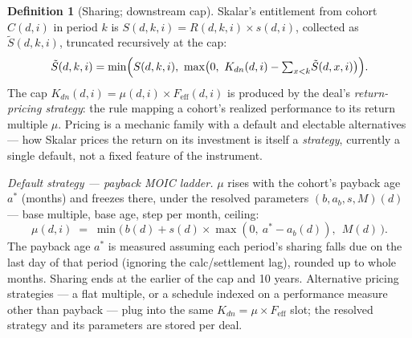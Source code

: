 \documentclass[11pt, a4paper]{article}
\theoremstyle{definition}
\newtheorem{definition}{Definition}[section]
\newcommand{\src}[1]{}
\newcommand{\KCIA}{downstream agreement}
\newcommand{\FudoTS}{downstream term sheet}
\newcommand{\Stil}{\tilde{S}}                     %
\newcommand{\capdn}{K_{dn}}                       %
\begin{document}
\begin{definition}[Sharing; downstream cap]\label{def:capdn}
Skalar's entitlement from cohort $C(d,i)$ in period $k$ is $S(d,k,i) = R(d,k,i) \times s(d,i)$, collected as $\Stil(d,k,i)$, truncated recursively at the cap:
\[
\Stil(d,k,i) = \min\Bigl( S(d,k,i),\ \max\bigl(0,\ \capdn(d,i) - {\textstyle\sum_{x<k}}\Stil(d,x,i)\bigr) \Bigr).
\]
The cap $\capdn(d,i) = \mu(d,i) \times F_{\mathrm{eff}}(d,i)$ is produced by the deal's \emph{return-pricing strategy}: the rule mapping a cohort's realized performance to its return multiple $\mu$. Pricing is a mechanic family with a default and electable alternatives --- how Skalar prices the return on its investment is itself a \emph{strategy}, currently a single default, not a fixed feature of the instrument.

\emph{Default strategy --- payback MOIC ladder.} $\mu$ rises with the cohort's payback age $a^*$ (months) and freezes there, under the resolved parameters $(b, a_b, s, M)(d)$ --- base multiple, base age, step per month, ceiling:
\[
\mu(d, i) \;=\; \min\bigl(\, b(d) + s(d) \times \max(0,\ a^* - a_b(d)),\ \ M(d) \,\bigr).
\]
The payback age $a^*$ is measured assuming each period's sharing falls due on the last day of that period (ignoring the calc/settlement lag), rounded up to whole months. Sharing ends at the earlier of the cap and 10 years. Alternative pricing strategies --- a flat multiple, or a schedule indexed on a performance measure other than payback --- plug into the same $\capdn = \mu \times F_{\mathrm{eff}}$ slot; the resolved strategy and its parameters are stored per deal.
\src{Template: \KCIA{} Sch.~A (``Return Multiple'', ``Return Multiple Cap'', ``Payback Period'', ``Investor Cap Amount'', ``Outstanding Investor Share''); \FudoTS{} ``Return Cap''.}
\end{definition}
\end{document}
